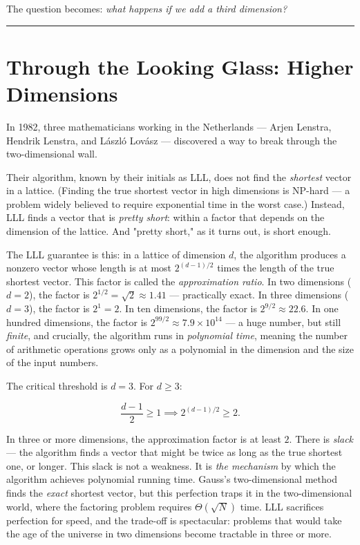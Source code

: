 \documentclass[12pt, letterpaper, openany]{book}
\theoremstyle{definition}
\theoremstyle{remark}
\begin{document}
The question becomes: \textit{what happens if we add a third dimension?}


\bigskip\noindent\rule{\textwidth}{0.4pt}\bigskip



\section*{Through the Looking Glass: Higher Dimensions}


In 1982, three mathematicians working in the Netherlands --- Arjen Lenstra, Hendrik Lenstra, and László Lovász --- discovered a way to break through the two-dimensional wall.

Their algorithm, known by their initials as LLL, does not find the \textit{shortest} vector in a lattice. (Finding the true shortest vector in high dimensions is NP-hard --- a problem widely believed to require exponential time in the worst case.) Instead, LLL finds a vector that is \textit{pretty short}: within a factor that depends on the dimension of the lattice. And "pretty short," as it turns out, is short enough.

The LLL guarantee is this: in a lattice of dimension $d$, the algorithm produces a nonzero vector whose length is at most $2^{(d-1)/2}$ times the length of the true shortest vector. This factor is called the \textit{approximation ratio}. In two dimensions ($d = 2$), the factor is $2^{1/2} = \sqrt{2} \approx 1.41$ --- practically exact. In three dimensions ($d = 3$), the factor is $2^1 = 2$. In ten dimensions, the factor is $2^{9/2} \approx 22.6$. In one hundred dimensions, the factor is $2^{99/2} \approx 7.9 \times 10^{14}$ --- a huge number, but still \textit{finite}, and crucially, the algorithm runs in \textit{polynomial time}, meaning the number of arithmetic operations grows only as a polynomial in the dimension and the size of the input numbers.

The critical threshold is $d = 3$. For $d \ge 3$:

\[
\frac{d-1}{2} \ge 1 \implies 2^{(d-1)/2} \ge 2.
\]

In three or more dimensions, the approximation factor is at least $2$. There is \textit{slack} --- the algorithm finds a vector that might be twice as long as the true shortest one, or longer. This slack is not a weakness. It is \textit{the mechanism} by which the algorithm achieves polynomial running time. Gauss's two-dimensional method finds the \textit{exact} shortest vector, but this perfection traps it in the two-dimensional world, where the factoring problem requires $\Theta(\sqrt{N})$ time. LLL sacrifices perfection for speed, and the trade-off is spectacular: problems that would take the age of the universe in two dimensions become tractable in three or more.
\end{document}
